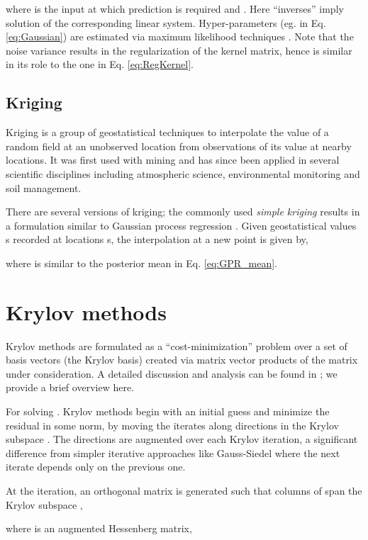 \documentclass[10pt,journal,letterpaper,compsoc]{IEEEtran}
\begin{document}
where  is the input at which prediction is required and . Here ``inverses'' imply solution of the corresponding linear system. Hyper-parameters (eg.  in Eq. \ref{eq:Gaussian}) are estimated via maximum likelihood techniques \cite{GPML_Rasmussen}. Note that the noise variance  results in the regularization of the kernel matrix, hence is similar in its role to the one in Eq. \ref{eq:RegKernel}.

\subsection{Kriging }
Kriging \cite{AppliedGeostatistics} is a group of geostatistical techniques to interpolate the value of a random field at an unobserved location from observations of its value at nearby locations. It was first used with mining and has since been applied in several scientific disciplines including atmospheric science, environmental monitoring and soil management.

There are several versions of kriging; the commonly used \emph{simple kriging} results in a formulation similar to Gaussian process regression \cite{AppliedGeostatistics}. Given geostatistical values s recorded at locations s, the interpolation at a new point  is given by,

where  is similar to the posterior mean in Eq. \ref{eq:GPR_mean}.

\section{Krylov methods \label{sec:Krylov}}
Krylov methods are formulated as a ``cost-minimization'' problem over a set of basis vectors (the Krylov basis) created via matrix vector products of the matrix under consideration. A detailed discussion and analysis can be found in \cite{SaadIterativeMethods,SaadEigen}; we provide a brief overview here.

For solving . Krylov methods begin with an initial guess  and minimize the residual  in some norm, by moving the iterates along directions in the Krylov subspace . The directions are augmented over each Krylov iteration, a significant difference from simpler iterative approaches like Gauss-Siedel where the next iterate depends only on the previous one.

At the  iteration, an orthogonal matrix  is generated such that columns of  span the Krylov subspace  \cite{SaadIterativeMethods},

where  is an augmented Hessenberg matrix,
 
\end{document}
